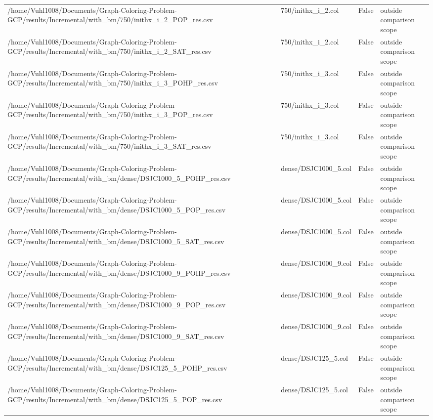 \begin{table}[htbp]
\begin{tabular}{llll}
/home/Vuhl1008/Documents/Graph-Coloring-Problem-GCP/results/Incremental/with\_bm/750/inithx\_i\_2\_POP\_res.csv & 750/inithx\_i\_2.col & False & outside comparison scope \\
/home/Vuhl1008/Documents/Graph-Coloring-Problem-GCP/results/Incremental/with\_bm/750/inithx\_i\_2\_SAT\_res.csv & 750/inithx\_i\_2.col & False & outside comparison scope \\
/home/Vuhl1008/Documents/Graph-Coloring-Problem-GCP/results/Incremental/with\_bm/750/inithx\_i\_3\_POHP\_res.csv & 750/inithx\_i\_3.col & False & outside comparison scope \\
/home/Vuhl1008/Documents/Graph-Coloring-Problem-GCP/results/Incremental/with\_bm/750/inithx\_i\_3\_POP\_res.csv & 750/inithx\_i\_3.col & False & outside comparison scope \\
/home/Vuhl1008/Documents/Graph-Coloring-Problem-GCP/results/Incremental/with\_bm/750/inithx\_i\_3\_SAT\_res.csv & 750/inithx\_i\_3.col & False & outside comparison scope \\
/home/Vuhl1008/Documents/Graph-Coloring-Problem-GCP/results/Incremental/with\_bm/dense/DSJC1000\_5\_POHP\_res.csv & dense/DSJC1000\_5.col & False & outside comparison scope \\
/home/Vuhl1008/Documents/Graph-Coloring-Problem-GCP/results/Incremental/with\_bm/dense/DSJC1000\_5\_POP\_res.csv & dense/DSJC1000\_5.col & False & outside comparison scope \\
/home/Vuhl1008/Documents/Graph-Coloring-Problem-GCP/results/Incremental/with\_bm/dense/DSJC1000\_5\_SAT\_res.csv & dense/DSJC1000\_5.col & False & outside comparison scope \\
/home/Vuhl1008/Documents/Graph-Coloring-Problem-GCP/results/Incremental/with\_bm/dense/DSJC1000\_9\_POHP\_res.csv & dense/DSJC1000\_9.col & False & outside comparison scope \\
/home/Vuhl1008/Documents/Graph-Coloring-Problem-GCP/results/Incremental/with\_bm/dense/DSJC1000\_9\_POP\_res.csv & dense/DSJC1000\_9.col & False & outside comparison scope \\
/home/Vuhl1008/Documents/Graph-Coloring-Problem-GCP/results/Incremental/with\_bm/dense/DSJC1000\_9\_SAT\_res.csv & dense/DSJC1000\_9.col & False & outside comparison scope \\
/home/Vuhl1008/Documents/Graph-Coloring-Problem-GCP/results/Incremental/with\_bm/dense/DSJC125\_5\_POHP\_res.csv & dense/DSJC125\_5.col & False & outside comparison scope \\
/home/Vuhl1008/Documents/Graph-Coloring-Problem-GCP/results/Incremental/with\_bm/dense/DSJC125\_5\_POP\_res.csv & dense/DSJC125\_5.col & False & outside comparison scope \\

\end{tabular}
\end{table}
